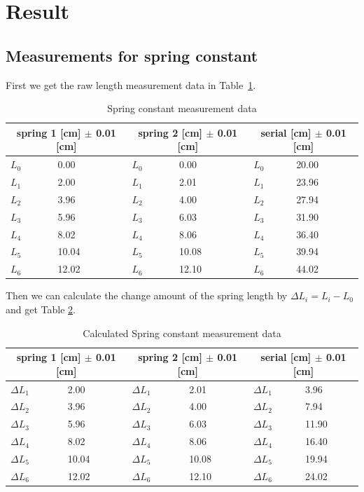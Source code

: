 \section{Result}

\subsection{Measurements for spring constant}

First we get the raw length measurement data in Table~\ref{s1}.
\begin{table}[H]
	\centering
	\begin{tabular}{|p{0.7cm}|p{3cm}||p{0.7cm}|p{3cm}||p{0.7cm}|p{3cm}|}
	\hline
	\multicolumn{2}{|c|}{spring 1 [cm] $\pm$ 0.01 [cm]} &
	\multicolumn{2}{|c|}{spring 2 [cm] $\pm$ 0.01 [cm]} &
	\multicolumn{2}{|c|}{serial   [cm] $\pm$ 0.01 [cm]} \\ \hline
	$L_0$ & 0.00  & $L_0$ & 0.00  & $L_0$ & 20.00 \\ \hline
	$L_1$ & 2.00  & $L_1$ & 2.01  & $L_1$ & 23.96 \\ \hline
	$L_2$ & 3.96  & $L_2$ & 4.00  & $L_2$ & 27.94 \\ \hline
	$L_3$ & 5.96  & $L_3$ & 6.03  & $L_3$ & 31.90 \\ \hline
	$L_4$ & 8.02  & $L_4$ & 8.06  & $L_4$ & 36.40 \\ \hline
	$L_5$ & 10.04 & $L_5$ & 10.08 & $L_5$ & 39.94 \\ \hline
	$L_6$ & 12.02 & $L_6$ & 12.10 & $L_6$ & 44.02 \\ \hline
	\end{tabular}
	\caption{Spring constant measurement data}
\label{s1}
\end{table}

Then we can calculate the change amount of the spring length by $\Delta L_i=L_i-L_0$ and get Table \ref{s2}.

\begin{table}[H]
	\centering
	\begin{tabular}{|p{0.7cm}|p{3cm}||p{0.7cm}|p{3cm}||p{0.7cm}|p{3cm}|}
	\hline
	\multicolumn{2}{|c|}{spring 1 [cm] $\pm$ 0.01 [cm]} &
	\multicolumn{2}{|c|}{spring 2 [cm] $\pm$ 0.01 [cm]} &
	\multicolumn{2}{|c|}{serial   [cm] $\pm$ 0.01 [cm]} \\ \hline
	$\Delta L_1$ & 2.00  & $\Delta L_1$ & 2.01  & $\Delta L_1$ & 3.96  \\ \hline
	$\Delta L_2$ & 3.96  & $\Delta L_2$ & 4.00  & $\Delta L_2$ & 7.94  \\ \hline
	$\Delta L_3$ & 5.96  & $\Delta L_3$ & 6.03  & $\Delta L_3$ & 11.90 \\ \hline
	$\Delta L_4$ & 8.02  & $\Delta L_4$ & 8.06  & $\Delta L_4$ & 16.40 \\ \hline
	$\Delta L_5$ & 10.04 & $\Delta L_5$ & 10.08 & $\Delta L_5$ & 19.94 \\ \hline
	$\Delta L_6$ & 12.02 & $\Delta L_6$ & 12.10 & $\Delta L_6$ & 24.02 \\ \hline
	\end{tabular}
	\caption{Calculated Spring constant measurement data}
\label{s2}
\end{table}

